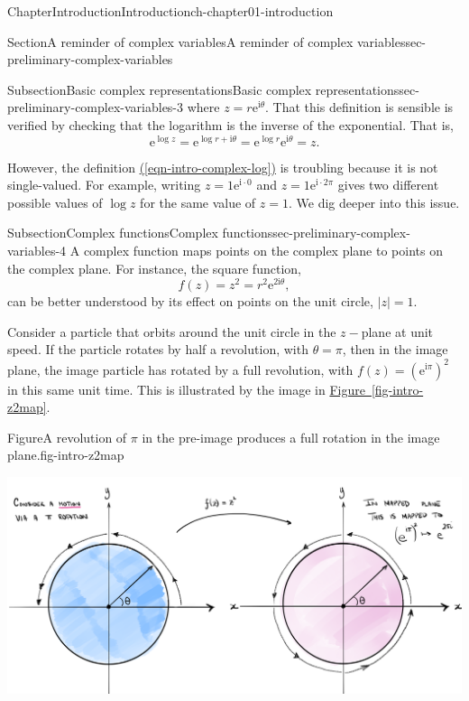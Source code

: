 \documentclass[oneside,10pt,]{book}
\newcommand{\xreffont}{\relax}
\numberwithin{equation}{section}
\newcommand{\e}{\mathrm{e}}
\newcommand{\im}{\mathrm{i}}
\begin{document}
\begin{chapterptx}{Chapter}{Introduction}{}{Introduction}{}{}{ch-chapter01-introduction}
\begin{sectionptx}{Section}{A reminder of complex variables}{}{A reminder of complex variables}{}{}{sec-preliminary-complex-variables}
\begin{subsectionptx}{Subsection}{Basic complex representations}{}{Basic complex representations}{}{}{sec-preliminary-complex-variables-3}
where \(z = r\e^{\im\theta}\). That this definition is sensible is verified by checking that the logarithm is the inverse of the exponential. That is,%
\begin{equation*}
\e^{\log z} = \e^{\log r + \im\theta} = \e^{\log r} \e^{\im\theta} = z.
\end{equation*}
%
\par
However, the definition \hyperref[eqn-intro-complex-log]{({\xreffont\ref{eqn-intro-complex-log}})} is troubling because it is not single-valued. For example, writing \(z = 1 \e^{\im \cdot 0}\) and \(z = 1 \e^{\im \cdot 2\pi}\) gives two different possible values of \(\log z\) for the same value of \(z = 1\). We dig deeper into this issue.%
\end{subsectionptx}
%
%
\typeout{************************************************}
\typeout{************************************************}
%
\begin{subsectionptx}{Subsection}{Complex functions}{}{Complex functions}{}{}{sec-preliminary-complex-variables-4}
A complex function maps points on the complex plane to points on the complex plane. For instance, the square function,%
\begin{equation*}
f(z) = z^2 = r^2 \e^{2\im \theta},
\end{equation*}
can be better understood by its effect on points on the unit circle, \(|z| = 1\).%
\par
Consider a particle that orbits around the unit circle in the \(z-\)plane at unit speed. If the particle rotates by half a revolution, with \(\theta = \pi\), then in the image plane, the image particle has rotated by a full revolution, with \(f(z) = (\e^{\im \pi})^2\) in this same unit time. This is illustrated by the image in \hyperref[fig-intro-z2map]{Figure~{\xreffont\ref{fig-intro-z2map}}}.%
\begin{figureptx}{Figure}{A revolution of \(\pi\) in the pre-image produces a full rotation in the image plane.}{fig-intro-z2map}{}%
\begin{image}{0}{1}{0}{}%
\includegraphics[width=\linewidth]{external/intro_z2map.png}

\end{image}
\end{figureptx}
\end{subsectionptx}
\end{sectionptx}
\end{chapterptx}
\end{document}
